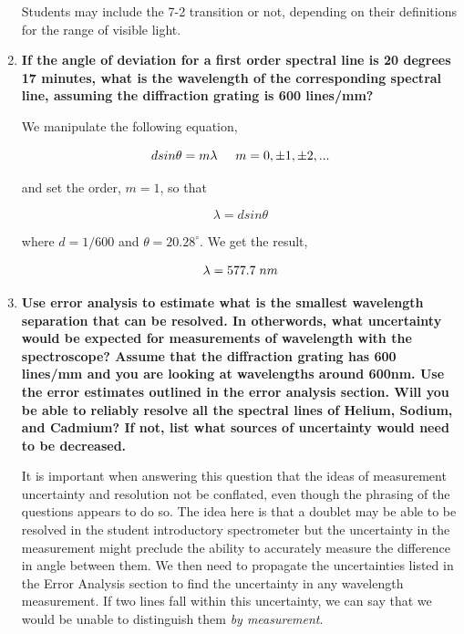 \begin{enumerate}
\noindent Students may include the 7-2 transition or not, depending on their definitions for the range of visible light.

\item {\bf If the angle of deviation for a first order spectral line is 20 degrees 17 minutes, what is the wavelength of the corresponding spectral line, assuming the diffraction grating is 600 lines/mm?}\newline

We manipulate the following equation,

\begin{equation}
dsin\theta=m\lambda\hspace{5mm}m=0,\pm1,\pm2,...
\label{equ:spcg3}
\end{equation}

\noindent and set the order, $m=1$, so that

\begin{equation}
\lambda=dsin\theta
\label{equ:spcg4}
\end{equation}

\noindent where $d=1/600$ and $\theta=20.28^{\circ}$. We get the result,

\begin{equation}
\lambda=577.7\hspace{1mm}nm
\label{equ:spcg5}
\end{equation}

\item {\bf Use error analysis to estimate what is the smallest wavelength separation that can be resolved. In otherwords, what uncertainty would be expected for measurements of wavelength with the spectroscope? Assume that the diffraction grating has 600 lines/mm and you are looking at wavelengths around 600nm. Use the error estimates outlined in the error analysis section. Will you be able to reliably resolve all the spectral lines of Helium, Sodium, and Cadmium? If not, list what sources of uncertainty would need to be decreased.}\newline

It is important when answering this question that the ideas of measurement uncertainty and resolution not be conflated, even though the phrasing of the questions appears to do so. The idea here is that a doublet may be able to be resolved in the student introductory spectrometer but the uncertainty in the measurement might preclude the ability to accurately measure the difference in angle between them. We then need to propagate the uncertainties listed in the Error Analysis section to find the uncertainty in any wavelength measurement. If two lines fall within this uncertainty, we can say that we would be unable to distinguish them {\it by measurement}. 


\end{enumerate}
